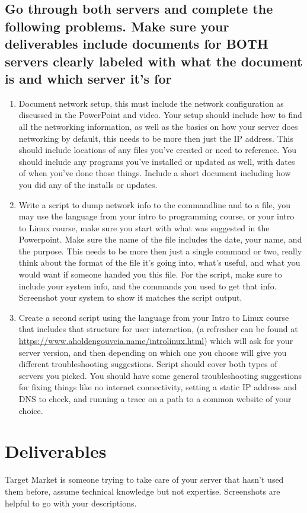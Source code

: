 \documentclass[12pt]{article}
\begin{document}
\subsection*{Go through both servers and complete the following problems.  Make sure your deliverables include documents for BOTH servers clearly labeled with what the document is and which server it's for}
    \begin{enumerate}
        \item Document network setup, this must include the network configuration as discussed in the PowerPoint and video. Your setup should include how to find all the networking information, as well as the basics on how your server does networking by default, this needs to be more then just the IP address. This should include locations of any files you've created or need to reference. You should include any programs you've installed or updated as well, with dates of when you've done those things. Include a short document including how you did any of the installs or updates. 
        \item Write a script to dump network info to the commandline and to a file, you may use the language from your intro to programming course, or your intro to Linux course, make sure you start with what was suggested in the Powerpoint.  Make sure the name of the file includes the date, your name, and the purpose.  This needs to be more then just a single command or two, really think about the format of the file it's going into, what's useful, and what you would want if someone handed you this file. For the script, make sure to include your system info, and the commands you used to get that info. Screenshot your system to show it matches the script output.
        \item Create a second script using the language from your Intro to Linux course that includes that structure for user interaction, (a refresher can be found at \url{https://www.aholdengouveia.name/introlinux.html}) which will ask for your server version, and then depending on which one you choose will give you different troubleshooting suggestions.  Script should cover both types of servers you picked.  You should have some general troubleshooting suggestions for fixing things like no internet connectivity, setting a static IP address and DNS to check, and running a trace on a path to a common website of your choice. 
    \end{enumerate}

\section*{Deliverables}
Target Market is someone trying to take care of your server that hasn't used them before, assume technical knowledge but not expertise.  Screenshots are helpful to go with your descriptions. 
\end{document}
